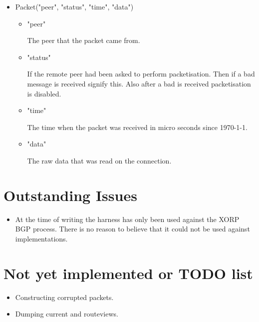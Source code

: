 \documentclass[11pt]{article}
\begin{document}
\begin{itemize}
\item Packet("peer", "status", "time", "data")

  \begin{itemize}
        \item "peer"
          
          The peer that the packet came from.

        \item "status" 
          
          If the remote peer had been asked to perform packetisation.
          Then if a bad message is received signify this. Also after a
          bad is received packetisation is disabled.

        \item "time"
          
          The time when the packet was received in micro seconds since
          \mbox{1970-1-1}.

        \item "data"
          
          The raw data that was read on the connection.

      \end{itemize}
\end{itemize}

\section{Outstanding Issues}

\begin{itemize}
\item At the time of writing the harness has only been used against
  the XORP BGP process. There is no reason to believe that it could
  not be used against implementations.
\end{itemize}

\section{\label{NYI} Not yet implemented or TODO list}

\begin{itemize}
\item Constructing corrupted packets.
\item Dumping current and routeviews.
\end{itemize}



\end{document}
